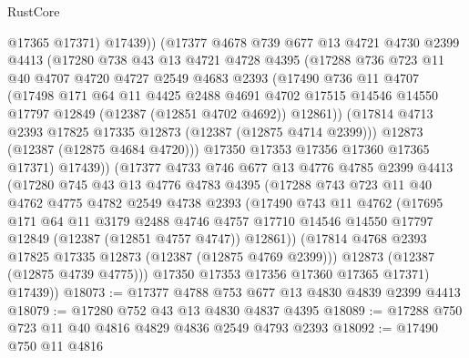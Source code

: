 \begin{lexlean}{RustCore}
\begin{coremodule}
              @17365
              @17371)
            @17439))
        (@17377
          @4678
          @739
          @677
          @13
          @4721
          @4730
          @2399
          @4413
          (@17280
            @738
            @43
            @13
            @4721
            @4728
            @4395
            (@17288
              @736
              @723
              @11
              @40
              @4707
              @4720
              @4727
              @2549
              @4683
              @2393
              (@17490
                @736
                @11
                @4707
                (@17498
                  @171
                  @64
                  @11
                  @4425
                  @2488
                  @4691
                  @4702
                  @17515
                  @14546
                  @14550
                  @17797
                  @12849
                  (@12387 (@12851 @4702 @4692))
                  @12861))
              (@17814 @4713 @2393 @17825 @17335 @12873 (@12387 (@12875 @4714 @2399)))
              @12873
              (@12387 (@12875 @4684 @4720)))
            @17350
            @17353
            @17356
            @17360
            @17365
            @17371)
          @17439))
      (@17377
        @4733
        @746
        @677
        @13
        @4776
        @4785
        @2399
        @4413
        (@17280
          @745
          @43
          @13
          @4776
          @4783
          @4395
          (@17288
            @743
            @723
            @11
            @40
            @4762
            @4775
            @4782
            @2549
            @4738
            @2393
            (@17490
              @743
              @11
              @4762
              (@17695
                @171
                @64
                @11
                @3179
                @2488
                @4746
                @4757
                @17710
                @14546
                @14550
                @17797
                @12849
                (@12387 (@12851 @4757 @4747))
                @12861))
            (@17814 @4768 @2393 @17825 @17335 @12873 (@12387 (@12875 @4769 @2399)))
            @12873
            (@12387 (@12875 @4739 @4775)))
          @17350
          @17353
          @17356
          @17360
          @17365
          @17371)
        @17439))
@18073 := @17377 @4788 @753 @677 @13 @4830 @4839 @2399 @4413
@18079 := @17280 @752 @43 @13 @4830 @4837 @4395
@18089 := @17288 @750 @723 @11 @40 @4816 @4829 @4836 @2549 @4793 @2393
@18092 := @17490 @750 @11 @4816

\end{coremodule}
\end{lexlean}
